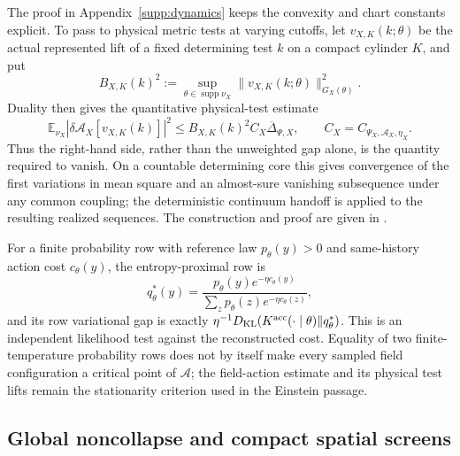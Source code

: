 \documentclass[11pt]{article}
\theoremstyle{definition}
\theoremstyle{remark}
\newcommand{\supp}{\operatorname{supp}}
\begin{document}
The proof in Appendix~\ref{supp:dynamics} keeps the convexity and chart
constants explicit.  To pass to physical metric tests at varying cutoffs, let
$v_{X,K}(k;\theta)$ be the actual represented lift of a fixed determining test
$k$ on a compact cylinder $K$, and put
\begin{equation}
 B_{X,K}(k)^2:=\sup_{\theta\in\supp\nu_X}
 \|v_{X,K}(k;\theta)\|_{G_X(\theta)}^2.
 \label{eq:main-test-lift-budget}
\end{equation}
Duality then gives the quantitative physical-test estimate
\begin{equation}
 \boxed{\mathbb E_{\nu_X}
       |\delta\mathcal A_X[v_{X,K}(k)]|^2
       \le B_{X,K}(k)^2C_X\overline\Delta_{\Psi,X},}
 \qquad C_X=C_{\Psi_X,\mathcal A_X,\eta_X}.
 \label{eq:main-physical-stationarity}
\end{equation}
Thus the right-hand side, rather than the unweighted gap alone, is the
quantity required to vanish.  On a countable determining core this gives
convergence of the first variations in mean square and an almost-sure
vanishing subsequence under any common coupling; the deterministic continuum
handoff is applied to the resulting realized sequences.  The construction and
proof are given in .

For a finite probability row with reference law $p_\theta(y)>0$ and
same-history action cost $c_\theta(y)$, the entropy-proximal row is
\begin{equation}
 q_\theta^*(y)=\frac{p_\theta(y)e^{-\eta c_\theta(y)}}
                    {\sum_zp_\theta(z)e^{-\eta c_\theta(z)}},
 \label{eq:main-gibbs-row}
\end{equation}
and its row variational gap is exactly
$\eta^{-1}D_{\rm KL}(K^{\rm acc}(\cdot\mid\theta)\Vert q_\theta^*)$.
This is an independent likelihood test against the reconstructed cost.
Equality of two finite-temperature probability rows does not by itself make
every sampled field configuration a critical point of $\mathcal A$; the
field-action estimate and its physical test lifts remain the stationarity
criterion used in the Einstein passage.

\subsection{Global noncollapse and compact spatial screens}
\end{document}
